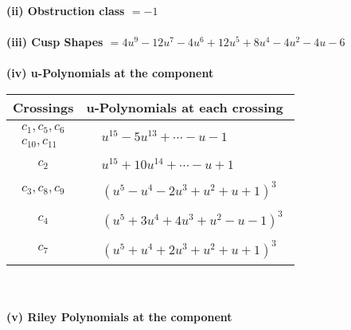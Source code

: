 \documentclass[1p]{elsarticle_modified}
\theoremstyle{definition}
\begin{document}
\flushleft \textbf{(ii) Obstruction class $= -1$}\\~\\
\flushleft \textbf{(iii) Cusp Shapes $= 4 u^9-12 u^7-4 u^6+12 u^5+8 u^4-4 u^2-4 u-6$}\\~\\
\newpage\renewcommand{\arraystretch}{1}
\flushleft \textbf{(iv) u-Polynomials at the component}\newline \\
\begin{tabular}{m{50pt}|m{274pt}}
Crossings & \hspace{64pt}u-Polynomials at each crossing \\
\hline $$\begin{aligned}c_{1},c_{5},c_{6}\\c_{10},c_{11}\end{aligned}$$&$\begin{aligned}
&u^{15}-5 u^{13}+\cdots- u-1
\end{aligned}$\\
\hline $$\begin{aligned}c_{2}\end{aligned}$$&$\begin{aligned}
&u^{15}+10 u^{14}+\cdots- u+1
\end{aligned}$\\
\hline $$\begin{aligned}c_{3},c_{8},c_{9}\end{aligned}$$&$\begin{aligned}
&(u^5- u^4-2 u^3+u^2+u+1)^3
\end{aligned}$\\
\hline $$\begin{aligned}c_{4}\end{aligned}$$&$\begin{aligned}
&(u^5+3 u^4+4 u^3+u^2- u-1)^3
\end{aligned}$\\
\hline $$\begin{aligned}c_{7}\end{aligned}$$&$\begin{aligned}
&(u^5+u^4+2 u^3+u^2+u+1)^3
\end{aligned}$\\
\hline
\end{tabular}\\~\\
\newpage\renewcommand{\arraystretch}{1}
\flushleft \textbf{(v) Riley Polynomials at the component}\newline \\
\end{document}
